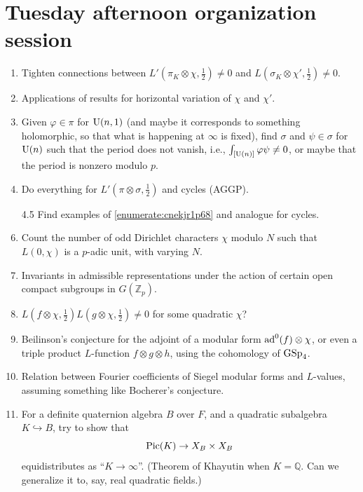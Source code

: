 \documentclass[reqno]{amsart} 
\begin{document}
\section{Tuesday afternoon organization session}

\begin{enumerate}
\item\label{enumerate:cnekjr1oym} Tighten connections between $L'(\pi_K \otimes \chi, \tfrac{1}{2} ) \neq 0$ and $L(\sigma_K \otimes \chi ', \tfrac{1}{2} ) \neq 0$.
\item\label{enumerate:cnekjr1pna} Applications of results for horizontal variation of $\chi$ and $\chi '$.
\item\label{enumerate:cnekjr1p68} Given $\varphi \in \pi $ for $\operatorname{U}(n, 1)$ (and maybe it corresponds to something holomorphic, so that what is happening at $\infty$ is fixed), find $\sigma$ and $\psi \in \sigma$ for $\operatorname{U}(n)$ such that the period does not vanish, i.e., $\int_{[\operatorname{U}(n)]} \varphi \psi \neq 0$, or maybe that the period is nonzero modulo $p$.
\item\label{enumerate:cnekjr1qyd} Do everything for $L '(\pi \otimes \sigma, \tfrac{1}{2})$ and cycles (AGGP).
\item[4.5]\label{enumerate:cnekjr1s9k} Find examples of \eqref{enumerate:cnekjr1p68} and analogue for cycles.
\item\label{enumerate:cnekjr5mnb} Count the number of odd Dirichlet characters $\chi$ modulo $N$ such that $L(0, \chi )$ is a $p$-adic unit, with varying $N$.
\item\label{enumerate:cnekjr47jp} Invariants in admissible representations under the action of certain open compact subgroups in $G(\mathbb{Z}_p)$.
\item\label{enumerate:cnekjr46s8} $L(f \otimes \chi, \tfrac{1}{2} ) L(g \otimes \chi, \tfrac{1}{2} ) \neq 0$ for some quadratic $\chi$?
\item\label{enumerate:cnekjr5udx} Beilinson's conjecture for the adjoint of a modular form $\operatorname{ad}^0(f) \otimes \chi$, or even a triple product $L$-function $f \otimes g \otimes h$, using the cohomology of $\operatorname{GSp}_4$.
\item\label{enumerate:cnekjr9kus} Relation between Fourier coefficients of Siegel modular forms and $L$-values, assuming something like Bocherer's conjecture.
\item\label{enumerate:cnekjr9lm8} For a definite quaternion algebra $B$ over $F$, and a quadratic subalgebra $K \hookrightarrow B$, try to show that
  \begin{equation*}
    \operatorname{Pic}(K) \rightarrow X_B \times X_B 
  \end{equation*}
  equidistributes as ``$K \rightarrow \infty$''.  (Theorem of Khayutin when $K = \mathbb{Q}$.  Can we generalize it to, say, real quadratic fields.)
\end{enumerate}
\end{document}
